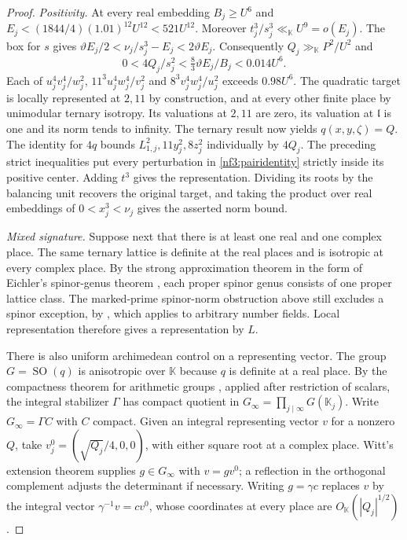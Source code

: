 \documentclass[11pt,letterpaper]{article}
\theoremstyle{definition}
\numberwithin{equation}{section}
\begin{document}
\begin{proof}
\smallskip\noindent
\emph{Positivity.}
At every real embedding $B_j\ge U^6$ and
$E_j<(1844/4)(1.01)^{12}U^{12}<521U^{12}$.
Moreover $t_j^3/s_j^3\ll_{\mathbb K}U^9=o(E_j)$.
The box for $s$ gives
$\vartheta E_j/2<\nu_j/s_j^3-E_j<2\vartheta E_j$.
Consequently $Q_j\gg_{\mathbb K}P^2/U^2$ and
\[
  0<4Q_j/s_j^2<\tfrac{8}{3}\vartheta E_j/B_j
     <0.014U^6 .
\]
Each of $u_j^4v_j^4/w_j^2$, $11^3u_j^4w_j^4/v_j^2$ and
$8^3v_j^4w_j^4/u_j^2$ exceeds $0.98U^6$.
The quadratic target is locally represented at $2,11$ by
construction, and at every other finite place by unimodular ternary
isotropy. Its valuations at $2,11$ are zero, its valuation at
$\mathfrak l$ is one and its norm tends to infinity. The ternary
result now yields $q(x,y,\zeta)=Q$. The identity for $4q$ bounds
$L_{1,j}^2,11y_j^2,8z_j^2$ individually by $4Q_j$. The preceding
strict inequalities put every perturbation in
\eqref{nf3:pairidentity} strictly inside its positive center. Adding
$t^3$ gives the representation. Dividing its roots by the balancing
unit recovers the original target, and taking the product over real
embeddings of $0<x_j^3<\nu_j$ gives the asserted norm bound.

\smallskip\noindent
\emph{Mixed signature.}
Suppose next that there is at least one real and one complex place.
The same ternary lattice is definite at the real places and is
isotropic at every complex place. By the strong approximation theorem
in the form of Eichler's spinor-genus theorem
\cite[Theorem~9.18]{nf3:eichler}, each proper spinor genus consists
of one proper lattice class. The marked-prime spinor-norm obstruction
above still excludes a spinor exception, by \cite[Theorem~1]{nf3:schulzespin},
which applies to arbitrary number fields. Local representation
therefore gives a representation by $L$.

There is also uniform archimedean control on a representing vector.
The group $G=\operatorname{SO}(q)$ is anisotropic over $\mathbb K$
because $q$ is definite at a real place. By the compactness theorem
for arithmetic groups \cite[\S11]{nf3:bhc}, applied after restriction
of scalars, the integral stabilizer $\Gamma$ has compact quotient in
$G_\infty=\prod_{j\mid\infty}G(\mathbb K_j)$.
Write $G_\infty=\Gamma C$ with $C$ compact. Given an integral
representing vector $v$ for a nonzero $Q$, take
$v^0_j=(\sqrt{Q_j}/4,0,0)$, with either square root at a complex
place. Witt's extension theorem supplies $g\in G_\infty$ with
$v=gv^0$; a reflection in the orthogonal complement adjusts the
determinant if necessary. Writing $g=\gamma c$ replaces $v$ by the
integral vector $\gamma^{-1}v=cv^0$, whose coordinates at every
place are $O_{\mathbb K}(|Q_j|^{1/2})$.


\end{proof}
\end{document}
